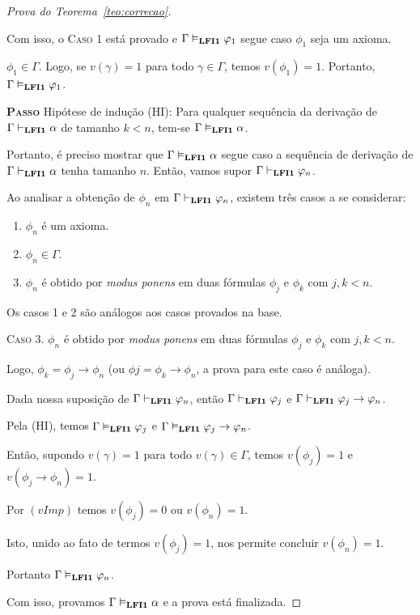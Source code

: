\begin{proof}[Prova do Teorema~\ref{teo:correcao}]
\begin{provaporcasos}
\begin{provaporsubcasos}
            \end{provaporsubcasos}

            Com isso, o \textsc{Caso 1} está provado e $\Gamma \vDash_{\textbf{LFI1}{}} \varphi_{1}$ segue caso $\phi_{1}$ seja um axioma.

            \casodeprova{} $\phi_{1} \in \Gamma$. Logo, se $v(\gamma) = 1$ para todo $\gamma \in \Gamma$, temos $v(\phi_{1}) = 1$. Portanto, $\Gamma \vDash_{\textbf{LFI1}{}} \varphi_{1}$.

        \end{provaporcasos}

         \noindent \textbf{\textsc{Passo}} Hipótese de indução (HI): Para qualquer sequência da derivação de $\Gamma \vdash_{\textbf{LFI1}{}} \alpha$ de tamanho $k < n$, tem-se $\Gamma \vDash_{\textbf{LFI1}{}} \alpha$. 
         
         Portanto, é preciso mostrar que $\Gamma \vDash_{\textbf{LFI1}{}} \alpha$ segue caso a sequência de derivação de $\Gamma \vdash_{\textbf{LFI1}{}} \alpha$ tenha tamanho $n$. Então, vamos supor $\Gamma \vdash_{\textbf{LFI1}{}} \varphi_{n}$.
         
         Ao analisar a obtenção de $\phi_{n}$ em $\Gamma \vdash_{\textbf{LFI1}{}} \varphi_{n}$, existem três casos a se considerar:
         
         \begin{enumerate}
            \item $\phi_{n}$ é um axioma.
            \item $\phi_{n} \in \Gamma$.
            \item $\phi_{n}$ é obtido por \textit{modus ponens} em duas fórmulas $\phi_{j}$ e $\phi_{k}$ com $j, k < n$. 
         \end{enumerate}
         
         Os casos 1 e 2 são análogos aos casos provados na base.
         
         \noindent \textsc{Caso 3.} $\phi_{n}$ é obtido por \textit{modus ponens} em duas fórmulas $\phi_{j}$ e $\phi_{k}$ com $j, k < n$. 
         
         Logo, $\phi_{k} = \phi_{j} \to \phi_{n}$ (ou $\phi{j} = \phi_{k} \to \phi_{n}$, a prova para este caso é análoga). 
         
         Dada nossa suposição de $\Gamma \vdash_{\textbf{LFI1}{}} \varphi_{n}$, então $\Gamma \vdash_{\textbf{LFI1}{}} \varphi_{j}$ e $\Gamma \vdash_{\textbf{LFI1}{}} \varphi_{j} \to \varphi_{n}$. 
         
         Pela (HI), temos $\Gamma \vDash_{\textbf{LFI1}{}} \varphi_{j}$ e $\Gamma \vDash_{\textbf{LFI1}{}} \varphi_{j} \to \varphi_{n}$. 
         
         Então, supondo $v(\gamma) = 1$ para todo $v(\gamma) \in \Gamma$, temos $v(\phi_{j}) = 1$ e $v(\phi_{j} \to \phi_{n}) = 1$. 
         
         Por $(vImp)$ temos $v(\phi_{j}) = 0$ ou $v(\phi_{n}) = 1$. 
         
         Isto, unido ao fato de termos $v(\phi_{j}) = 1$, nos permite concluir $v(\phi_{n}) = 1$. 
         
         Portanto $\Gamma \vDash_{\textbf{LFI1}{}} \varphi_{n}$.

         \noindent Com isso, provamos $\Gamma \vDash_{\textbf{LFI1}{}} \alpha$ e a prova está finalizada.

    \end{proof}
